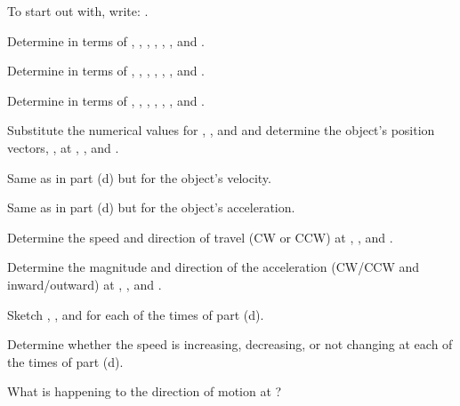 {{\begin{one-digit-list}
\begin{one-digit-list}
\item [a.] To start out with, write: .
\item [  ] Determine  in terms of , \m{\theta}, , \m{\uvec{\theta}}, , , and .
\item [b.] Determine  in terms of , \m{\theta}, , \m{\uvec{\theta}}, , , and .
\item [c.] Determine  in terms of , \m{\theta}, , \m{\uvec{\theta}}, , , and .
\item [d.] Substitute the numerical values for , , and  and determine the object's position
vectors, , at , , and .
\item [e.] Same as in part (d) but for the object's velocity.
\item [f.] Same as in part (d) but for the object's acceleration.
\item [g.] Determine the speed and direction of travel (CW or CCW) at ,
           , and . 
\item [h.] Determine the magnitude and direction of the acceleration (CW/CCW and inward/outward) at ,
           , and . 
\item [j.] Sketch , , and  for each of the times
           of part (d).
\item [k.] Determine whether the speed is increasing, decreasing, or not
           changing at each of the times of part (d).
\item [l.] What is happening to the direction of motion at ?
\end{one-digit-list}
\end{one-digit-list}

\BriefAns

}}
